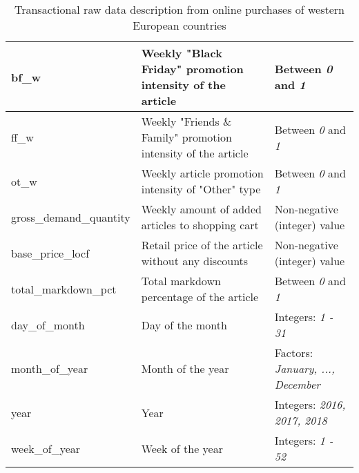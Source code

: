 \begin{table}[H]
\begin{adjustbox}{max width=\textwidth}
\begin{tabular}{|l|l|l|}
 \hline
bf\_w                   & Weekly "Black Friday" promotion intensity of the article                                                                    & Between \textit{0} and \textit{1}              \\ \hline
ff\_w                   & Weekly "Friends \& Family" promotion intensity of the article                                                               & Between \textit{0} and \textit{1}              \\ \hline
ot\_w                   & Weekly article promotion intensity of "Other" type                                                                          & Between \textit{0} and \textit{1}              \\ \hline
gross\_demand\_quantity & Weekly amount of added articles to shopping cart                                                                            & Non-negative (integer) value \\ \hline
base\_price\_locf       & Retail price of the article without any discounts                                                                           & Non-negative (integer) value \\ \hline
total\_markdown\_pct    &                                                                                                          Total markdown percentage of the article &    Between \textit{0} and \textit{1}                          \\ \hline
day\_of\_month          & Day of the month                                                                                                            & Integers: \textit{1 - 31}                       \\ \hline
month\_of\_year         & Month of the year                                                                                                           & Factors: \textit{January, ..., December}       \\ \hline
year                    & Year                                                                                                                        & Integers: \textit{2016, 2017, 2018}             \\ \hline
week\_of\_year          & Week of the year                                                                                                            & Integers: \textit{1 - 52}                       \\ \hline
\end{tabular}
\end{adjustbox}
\caption{Transactional raw data description from online purchases of western European countries}
\label{tab:transactional_data}
\end{table}

